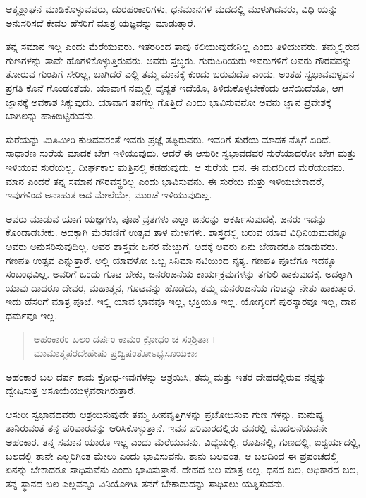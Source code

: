 {\small ಆತ್ಮಶ್ಲಾಘನೆ ಮಾಡಿಕೊಳ್ಳುವವರು, ದುರಹಂಕಾರಿಗಳು, ಧನಮಾನಗಳ ಮದದಲ್ಲಿ ಮುಳುಗಿದವರು, ವಿಧಿ ಯನ್ನು ಅನುಸರಿಸದೆ ಕೇವಲ ಹೆಸರಿಗೆ ಮಾತ್ರ ಯಜ್ಞವನ್ನು ಮಾಡುತ್ತಾರೆ.}

ತನ್ನ ಸಮಾನ ಇಲ್ಲ ಎಂದು ಮೆರೆಯುವರು. ಇತರರಿಂದ ತಾವು ಕಲಿಯುವುದೇನಿಲ್ಲ ಎಂದು ತಿಳಿಯುವರು. ತಮ್ಮಲ್ಲಿರುವ ಗುಣಗಳನ್ನು ತಾವೇ ಹೊಗಳಿಕೊಳ್ಳುತ್ತಿರುವರು. ಅವರು ಸ್ತಬ್ಧರು. ಗುರುಹಿರಿಯರು ಇವರುಗಳಿಗೆ ಅವರು ಗೌರವವನ್ನು ತೋರುವ ಗುಂಪಿಗೆ ಸೇರಿಲ್ಲ, ಬಾಗಿದರೆ ಎಲ್ಲಿ ತಮ್ಮ ಮಾನಕ್ಕೆ ಕುಂದು ಬರುವುದೊ ಎಂದು. ಅಂತಹ ಸ್ವಭಾವವುಳ್ಳವನ ಪ್ರಗತಿ ಕೊನೆ ಗೊಂಡಂತೆಯೆ. ಯಾವಾಗ ನಮ್ಮಲ್ಲಿ ದೈನ್ಯತೆ ಇದೆಯೊ, ತಿಳಿದುಕೊಳ್ಳಬೇಕೆಂದು ಆಸೆಯಿದೆಯೊ, ಆಗ ಜ್ಞಾನಕ್ಕೆ ಅವಕಾಶ ಸಿಕ್ಕುವುದು. ಯಾವಾಗ ತನಗೆಲ್ಲ ಗೊತ್ತಿದೆ ಎಂದು ಭಾವಿಸುವನೋ ಅವನು ಜ್ಞಾನ ಪ್ರವೇಶಕ್ಕೆ ಬಾಗಿಲನ್ನು ಹಾಕಿಬಿಟ್ಟಿರುವನು.

ಸುರೆಯನ್ನು ಮಿತಿಮೀರಿ ಕುಡಿದವರಂತೆ ಇವರು ಪ್ರಜ್ಞೆ ತಪ್ಪಿರುವರು. ಇವರಿಗೆ ಸುರೆಯ ಮಾದಕ ನೆತ್ತಿಗೆ ಏರಿದೆ. ಸಾಧಾರಣ ಸುರೆಯ ಮಾದಕ ಬೇಗ ಇಳಿಯುವುದು. ಆದರೆ ಈ ಆಸುರೀ ಸ್ವಭಾವದವರ ಸುರೆಯಾದರೋ ಬೇಗ ಮತ್ತು ಇಳಿಯುವ ಸುರೆಯಲ್ಲ. ದೀರ್ಘಕಾಲ ಮತ್ತಿನಲ್ಲಿ ಕೆಡಹುವುದು. ಆ ಸುರೆಯೆ ಧನ. ಈ ಮದದಿಂದ ಮೆರೆಯುವನು. ಮಾನ ಎಂದರೆ ತನ್ನ ಸಮಾನ ಗೌರವಸ್ಥರಿಲ್ಲ ಎಂದು ಭಾವಿಸುವನು. ಈ ಸುರೆಯ ಮತ್ತು ಇಳಿಯಬೇಕಾದರೆ, ಇವುಗಳಿಂದ ಅನಾಹುತ ಆದ ಮೇಲೆಯೇ, ಮುಂಚೆ ಇಳಿಯುವುದಿಲ್ಲ.

ಅವರು ಮಾಡುವ ಯಾಗ ಯಜ್ಞಗಳು, ಪೂಜೆ ವ್ರತಗಳು ಎಲ್ಲಾ ಜನರನ್ನು ಆಕರ್ಷಿಸುವುದಕ್ಕೆ. ಜನರು ಇದನ್ನು ಕೊಂಡಾಡಬೇಕು. ಅದಕ್ಕಾಗಿ ಮೆರವಣಿಗೆ ಉತ್ಸವ ತಾಳ ಮೇಳಗಳು. ಶಾಸ್ತ್ರದಲ್ಲಿ ಬರುವ ಯಾವ ವಿಧಿನಿಯಮವನ್ನೂ ಅವರು ಅನುಸರಿಸುವುದಿಲ್ಲ. ಅವರ ಶಾಸ್ತ್ರವೇ ಜನರ ಮೆಚ್ಚುಗೆ. ಅದಕ್ಕೆ ಅವರು ಏನು ಬೇಕಾದರೂ ಮಾಡುವರು. ಗಣಪತಿ ಉತ್ಸವ ಎನ್ನುತ್ತಾರೆ. ಅಲ್ಲಿ ಯಾವಳೋ ಒಬ್ಬ ಸಿನಿಮಾ ನಟಿಯಿಂದ ನೃತ್ಯ. ಗಣಪತಿ ಪೂಜೆಗೂ ಇದಕ್ಕೂ ಸಂಬಂಧವಿಲ್ಲ. ಅವರಿಗೆ ಒಂದು ಗೂಟ ಬೇಕು, ಜನರಂಜನೆಯ ಕಾರ್ಯಕ್ರಮಗಳನ್ನು ತಗುಲಿ ಹಾಕುವುದಕ್ಕೆ. ಅದಕ್ಕಾಗಿ ಯಾವು ದಾದರೂ ದೇವರ, ಮಹಾತ್ಮನ, ಗೂಟವನ್ನು ಹೊಡೆದು, ತಮ್ಮ ಮನರಂಜನೆಯ ಗಂಟನ್ನು ನೇತು ಹಾಕುತ್ತಾರೆ. ಇದು ಹೆಸರಿಗೆ ಮಾತ್ರ ಪೂಜೆ. ಇಲ್ಲಿ ಯಾವ ಭಾವವೂ ಇಲ್ಲ, ಭಕ್ತಿಯೂ ಇಲ್ಲ. ಯೋಗ್ಯರಿಗೆ ಪುರಸ್ಕಾರವೂ ಇಲ್ಲ, ದಾನ ಧರ್ಮವೂ ಇಲ್ಲ.

\begin{verse}
ಅಹಂಕಾರಂ ಬಲಂ ದರ್ಪಂ ಕಾಮಂ ಕ್ರೋಧಂ ಚ ಸಂಶ್ರಿತಾಃ ।\\ಮಾಮಾತ್ಮಪರದೇಹೇಷು ಪ್ರದ್ವಿಷಂತೋಽಭ್ಯಸೂಯಕಾಃ 
\end{verse}

{\small ಅಹಂಕಾರ ಬಲ ದರ್ಪ ಕಾಮ ಕ್ರೋಧ-ಇವುಗಳನ್ನು ಆಶ್ರಯಿಸಿ, ತಮ್ಮ ಮತ್ತು ಇತರ ದೇಹದಲ್ಲಿರುವ ನನ್ನನ್ನು ದ್ವೇಷಿಸುತ್ತ ಅಸೂಯೆಯುಳ್ಳವರಾಗಿರುತ್ತಾರೆ.}

ಆಸುರೀ ಸ್ವಭಾವದವರು ಆಶ್ರಯಿಸುವುದೇ ತಮ್ಮ ಹೀನವೃತ್ತಿಗಳನ್ನು ಪ್ರಚೋದಿಸುವ ಗುಣ ಗಳನ್ನು. ಮನುಷ್ಯ ತಾನಿರುವಂತೆ ತನ್ನ ಪರಿವಾರವನ್ನು ಆರಿಸಿಕೊಳ್ಳುತ್ತಾನೆ. ಇವನ ಪರಿವಾರದಲ್ಲಿರು ವವರಲ್ಲಿ ಮೊದಲನೆಯವನೇ ಅಹಂಕಾರ. ತನ್ನ ಸಮಾನ ಯಾರೂ ಇಲ್ಲ ಎಂದು ಮೆರೆಯುವನು. ವಿದ್ಯೆಯಲ್ಲಿ, ರೂಪಿನಲ್ಲಿ, ಗುಣದಲ್ಲಿ, ಐಶ್ವರ್ಯದಲ್ಲಿ, ಬಲದಲ್ಲಿ ತಾನೇ ಎಲ್ಲರಿಗಿಂತ ಮೇಲು ಎಂದು ಭಾವಿಸುವನು. ತಾನು ಬಲವಂತ, ಆ ಬಲದಿಂದ ಈ ಪ್ರಪಂಚದಲ್ಲಿ ಏನನ್ನು ಬೇಕಾದರೂ ಸಾಧಿಸುವೆನು ಎಂದು ಭಾವಿಸುತ್ತಾನೆ. ದೇಹದ ಬಲ ಮಾತ್ರ ಅಲ್ಲ, ಧನದ ಬಲ, ಅಧಿಕಾರದ ಬಲ, ತನ್ನ ಸ್ಥಾನದ ಬಲ ಎಲ್ಲವನ್ನೂ ವಿನಿಯೋಗಿಸಿ ತನಗೆ ಬೇಕಾದುದನ್ನು ಸಾಧಿಸಲು ಯತ್ನಿಸುವನು.

